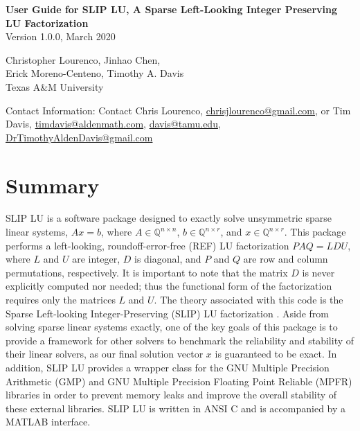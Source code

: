 \documentclass[12pt]{article}
\theoremstyle{definition}
\begin{document}
\begin{center}
\begin{large}
\textbf{User Guide for SLIP LU, A Sparse Left-Looking Integer
Preserving LU Factorization} \\
\vspace{5mm}
Version 1.0.0, March 2020 %
\vspace{20mm}

Christopher Lourenco, Jinhao Chen, \\ Erick Moreno-Centeno, Timothy A. Davis \\

Texas A\&M University

\vspace{20mm}
Contact Information: Contact Chris Lourenco, \href{mailto:chrisjlourenco@gmail.com}{chrisjlourenco@gmail.com}, or Tim Davis,
\href{mailto:timdavis@aldenmath.com}{timdavis@aldenmath.com},
\href{mailto:davis@tamu.edu}{davis@tamu.edu},
\href{DrTimothyAldenDavis@gmail.com}{DrTimothyAldenDavis@gmail.com}

\end{large}
\end{center}

\newpage

\tableofcontents

\newpage

\section{Summary}
\label{s:intro}

SLIP LU is a software package designed to exactly solve unsymmetric sparse
linear systems, $ A x = b$, where $A \in \mathbb{Q}^{n \times
n}$, $b \in \mathbb{Q}^{n \times r}$, and $x \in \mathbb{Q}^{n \times
r}$. This package performs a left-looking, roundoff-error-free (REF) LU
factorization $P A Q = L D U$, where $L$ and $U$ are integer, $D$ is diagonal,
and $P$ and $Q$ are row and column permutations, respectively. It is important
to note that the matrix $D$ is never explicitly computed nor needed; thus the
functional form of the factorization requires only the matrices $L$ and $U$.
The theory associated with this code is the Sparse Left-looking
Integer-Preserving (SLIP) LU factorization \cite{lourenco2019exact}. Aside from
solving sparse linear systems exactly, one of the key goals of this package is
to provide a framework for other solvers to benchmark the reliability and
stability of their linear solvers, as our final solution vector $x$ is
guaranteed to be exact. In addition, SLIP LU provides a wrapper class for the
GNU Multiple Precision Arithmetic (GMP) \cite{granlund2015gnu} and GNU Multiple
Precision Floating Point Reliable (MPFR) \cite{fousse2007mpfr} libraries in
order to prevent memory leaks and improve the overall stability of these
external libraries. SLIP LU is written in ANSI C and is accompanied by a MATLAB
interface.
\end{document}
